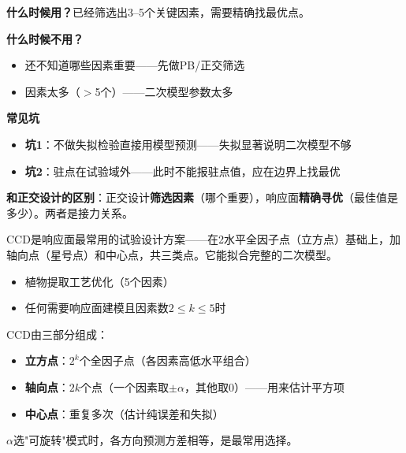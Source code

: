 \begin{algonotes}
\textbf{什么时候用？}已经筛选出3--5个关键因素，需要精确找最优点。

\textbf{什么时候不用？}
\begin{itemize}
    \item 还不知道哪些因素重要——先做PB/正交筛选
    \item 因素太多（$>$5个）——二次模型参数太多
\end{itemize}

\textbf{常见坑}
\begin{itemize}
    \item \textbf{坑1}：不做失拟检验直接用模型预测——失拟显著说明二次模型不够
    \item \textbf{坑2}：驻点在试验域外——此时不能报驻点值，应在边界上找最优
\end{itemize}

\textbf{和正交设计的区别}：正交设计\textbf{筛选因素}（哪个重要），响应面\textbf{精确寻优}（最佳值是多少）。两者是接力关系。
\end{algonotes}


\begin{algointro}
CCD是响应面最常用的试验设计方案——在2水平全因子点（立方点）基础上，加轴向点（星号点）和中心点，共三类点。它能拟合完整的二次模型。
\end{algointro}

\begin{algoscene}
\begin{itemize}
    \item 植物提取工艺优化（5个因素）
    \item 任何需要响应面建模且因素数$2\leq k\leq5$时
\end{itemize}
\end{algoscene}

\begin{algoprinciple}
CCD由三部分组成：
\begin{itemize}
    \item \textbf{立方点}：$2^k$个全因子点（各因素高低水平组合）
    \item \textbf{轴向点}：$2k$个点（一个因素取$\pm\alpha$，其他取0）——用来估计平方项
    \item \textbf{中心点}：重复多次（估计纯误差和失拟）
\end{itemize}

$\alpha$选"可旋转"模式时，各方向预测方差相等，是最常用选择。
\end{algoprinciple}

